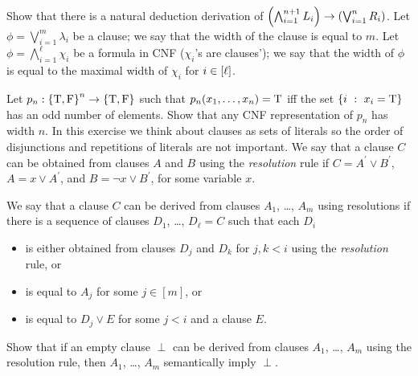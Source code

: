 \begin{chapterendexercises}
      Show that there is a natural deduction derivation of
      $\left(
          \bigwedge_{i = 1}^{n + 1} L_i
        \right)
        \rightarrow
        \left(
          \bigvee_{i = 1}^{n} R_i
        \right)$.
    \exercise Let $\phi = \bigvee_{i = 1}^m \lambda_i$ be a clause; we say that
      the width of the clause is equal to $m$.
      Let $\phi = \bigwedge_{i = 1}^\ell \chi_i$ be a formula in CNF
      ($\chi_i$'s are clauses'); we say that the width of $\phi$ is equal to
      the maximal width of $\chi_i$ for $i \in [{\ell}]$.

      Let $p_n : \set{\ltrue, \lfalse}^n \to \set{\ltrue, \lfalse}$ such that
      $p_n(x_1, \dots, x_n) = \text{T}$
      iff the set $\set[x_i = \ltrue]{i}$ has an odd number of elements.
      Show that any CNF representation of $p_n$ has width $n$.
    \exercise In this exercise we think about clauses as sets of literals so
      the order of disjunctions and repetitions of literals are not important.
      We say that a clause $C$ can be obtained from clauses $A$ and $B$
      using the \emph{resolution} rule if $C = A^\prime \lor B^\prime$,
      $A = x \lor A^\prime$, and $B = \lnot x \lor B^\prime$, for some variable
      $x$.

      We say that a clause $C$ can be derived from clauses $A_1$, \dots, $A_m$
      using resolutions
      if there is a sequence of clauses $D_1$, \dots, $D_\ell = C$ such that
      each $D_i$
      \begin{itemize}
        \item is either obtained from clauses $D_j$ and $D_k$ for $j, k < i$ using the
          \emph{resolution} rule, or
        \item is equal to $A_j$ for some $j \in [m]$, or
        \item is equal to $D_j \lor E$ for some $j < i$ and a clause $E$.
      \end{itemize}

      Show that if an empty clause $\perp$ can be derived from clauses $A_1$, \dots, $A_m$ using the resolution rule, then $A_1$, \dots, $A_m$ semantically imply $\perp$.
\end{chapterendexercises}
